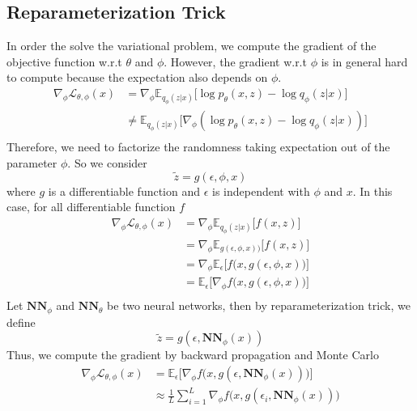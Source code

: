 \documentclass[12pt]{report}
\theoremstyle{definition}
\theoremstyle{remark}
\newcommand{\E}{\mathbb{E}}
\begin{document}
\subsection{Reparameterization Trick}
In order the solve the variational problem, we compute the gradient of the objective function w.r.t $\theta$ and $\phi$. However, the gradient w.r.t $\phi$ is in general hard to compute because the expectation also depends on $\phi$.
\begin{equation}
  \begin{split}
      \nabla_{\phi}\mathcal{L}_{\theta, \phi}(x) &= \nabla_{\phi} \E_{q_{\phi}(z|x)}\big[\log p_{\theta}(x,z)- \log q_{\phi}(z|x) \big] \\ 
      &\neq  \E_{q_{\phi}(z|x)}\big[\nabla_{\phi}(\log p_{\theta}(x,z)- \log q_{\phi}(z|x) )\big] \\ 
  \end{split}
\end{equation}
Therefore, we need to factorize the randomness taking expectation out of the parameter $\phi$. So we consider 
\begin{equation}
  \tilde{z} = g(\epsilon,\phi,x)
\end{equation}
where $g$ is a differentiable function and $\epsilon$ is independent with $\phi$ and $x$. In this case, for all differentiable function $f$ 
\begin{equation}
  \begin{split}
    \nabla_{\phi}\mathcal{L}_{\theta, \phi}(x)&= \nabla_{\phi} \E_{q_{\phi}(z|x)}\Big[f(x,z)\Big]\\
    &= \nabla_{\phi} \E_{g(\epsilon,\phi,x))}\Big[f(x,z)\Big]\\
    &= \nabla_{\phi} \E_{\epsilon}\Big[f\big(x,g(\epsilon,\phi,x)\big)\Big]\\
    &= \E_{\epsilon}\Big[\nabla_{\phi} f\big(x,g(\epsilon,\phi,x)\big)\Big]\\
  \end{split}
\end{equation}
Let $\mathbf{NN}_{\phi}$ and $\mathbf{NN}_{\theta}$ be two neural networks, then by reparameterization trick, we define 
\begin{equation}
  \tilde{z} = g(\epsilon, \mathbf{NN}_{\phi}(x))
\end{equation}
Thus, we compute the gradient by backward propagation and Monte Carlo 
\begin{equation}
  \begin{split}
    \nabla_{\phi}\mathcal{L}_{\theta, \phi}(x) &= \E_{\epsilon}\Big[\nabla_{\phi} f\big(x,g(\epsilon, \mathbf{NN}_{\phi}(x))\big)\Big]\\
    &\approx \frac{1}{L}\sum_{i=1}^{L}\nabla_{\phi} f\big(x,g(\epsilon_{i}, \mathbf{NN}_{\phi}(x))\big)\\
  \end{split}
\end{equation}
\end{document}
